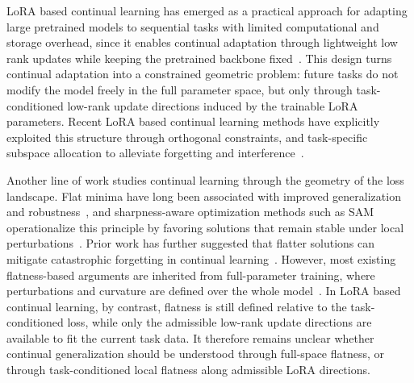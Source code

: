 \documentclass[10pt]{article} %
\begin{document}
LoRA based continual learning has emerged as a practical approach for adapting large pretrained models to sequential tasks with limited computational and storage overhead, since it enables continual adaptation through lightweight low rank updates while keeping the pretrained backbone fixed~\cite{hu2022lora}. This design turns continual adaptation into a constrained geometric problem: future tasks do not modify the model freely in the full parameter space, but only through task-conditioned low-rank update directions induced by the trainable LoRA parameters. Recent LoRA based continual learning methods have explicitly exploited this structure through orthogonal constraints, and task-specific subspace allocation to alleviate forgetting and interference~\cite{Gao_2023_ICCV,NEURIPS2020_70d85f35,wang2023orthogonal,wu2025sdlorascalabledecoupledlowrank}. 


Another line of work studies continual learning through the geometry of the loss landscape. Flat minima have long been associated with improved generalization and robustness~\cite{FlatMinima1997,wu2017understandinggeneralizationdeeplearning,chaudhariEntropySGDBiasingGradient2019,NEURIPS2020_518a38cc,NEURIPS2021_995f5e03,JMLRAnEmpiricalInvestigatio,yangRevisitingFlatnessAwareOptimization2025}, and sharpness-aware optimization methods such as SAM operationalize this principle by favoring solutions that remain stable under local perturbations~\cite{foretSharpnessAwareMinimizationEfficiently2021,pmlr-v151-bisla22a,Zhang_GAM,NEURIPS2024_C-Flat}. Prior work has further suggested that flatter solutions can mitigate catastrophic forgetting in continual learning~\cite{NEURIPS2020_518a38cc,JMLRAnEmpiricalInvestigatio,shiOvercomingCatastrophicForgetting2021,liRevisitingCatastrophicForgetting2024}. However, most existing flatness-based arguments are inherited from full-parameter training, where perturbations and curvature are defined over the whole model~\cite{li2024flatlora}. In LoRA based continual learning, by contrast, flatness is still defined relative to the task-conditioned loss, while only the admissible low-rank update directions are available to fit the current task data. It therefore remains unclear whether continual generalization should be understood through full-space flatness, or through task-conditioned local flatness along admissible LoRA directions.
\end{document}
